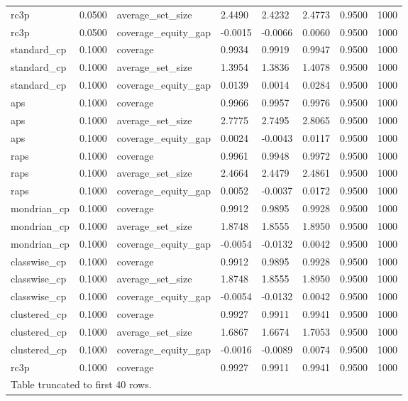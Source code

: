\begin{table}[htbp]
\begin{tabular}{llllllll}
rc3p & 0.0500 & average\_set\_size & 2.4490 & 2.4232 & 2.4773 & 0.9500 & 1000 \\
rc3p & 0.0500 & coverage\_equity\_gap & -0.0015 & -0.0066 & 0.0060 & 0.9500 & 1000 \\
standard\_cp & 0.1000 & coverage & 0.9934 & 0.9919 & 0.9947 & 0.9500 & 1000 \\
standard\_cp & 0.1000 & average\_set\_size & 1.3954 & 1.3836 & 1.4078 & 0.9500 & 1000 \\
standard\_cp & 0.1000 & coverage\_equity\_gap & 0.0139 & 0.0014 & 0.0284 & 0.9500 & 1000 \\
aps & 0.1000 & coverage & 0.9966 & 0.9957 & 0.9976 & 0.9500 & 1000 \\
aps & 0.1000 & average\_set\_size & 2.7775 & 2.7495 & 2.8065 & 0.9500 & 1000 \\
aps & 0.1000 & coverage\_equity\_gap & 0.0024 & -0.0043 & 0.0117 & 0.9500 & 1000 \\
raps & 0.1000 & coverage & 0.9961 & 0.9948 & 0.9972 & 0.9500 & 1000 \\
raps & 0.1000 & average\_set\_size & 2.4664 & 2.4479 & 2.4861 & 0.9500 & 1000 \\
raps & 0.1000 & coverage\_equity\_gap & 0.0052 & -0.0037 & 0.0172 & 0.9500 & 1000 \\
mondrian\_cp & 0.1000 & coverage & 0.9912 & 0.9895 & 0.9928 & 0.9500 & 1000 \\
mondrian\_cp & 0.1000 & average\_set\_size & 1.8748 & 1.8555 & 1.8950 & 0.9500 & 1000 \\
mondrian\_cp & 0.1000 & coverage\_equity\_gap & -0.0054 & -0.0132 & 0.0042 & 0.9500 & 1000 \\
classwise\_cp & 0.1000 & coverage & 0.9912 & 0.9895 & 0.9928 & 0.9500 & 1000 \\
classwise\_cp & 0.1000 & average\_set\_size & 1.8748 & 1.8555 & 1.8950 & 0.9500 & 1000 \\
classwise\_cp & 0.1000 & coverage\_equity\_gap & -0.0054 & -0.0132 & 0.0042 & 0.9500 & 1000 \\
clustered\_cp & 0.1000 & coverage & 0.9927 & 0.9911 & 0.9941 & 0.9500 & 1000 \\
clustered\_cp & 0.1000 & average\_set\_size & 1.6867 & 1.6674 & 1.7053 & 0.9500 & 1000 \\
clustered\_cp & 0.1000 & coverage\_equity\_gap & -0.0016 & -0.0089 & 0.0074 & 0.9500 & 1000 \\
rc3p & 0.1000 & coverage & 0.9927 & 0.9911 & 0.9941 & 0.9500 & 1000 \\
\multicolumn{8}{l}{Table truncated to first 40 rows.} \\
\hline
\end{tabular}
\end{table}
